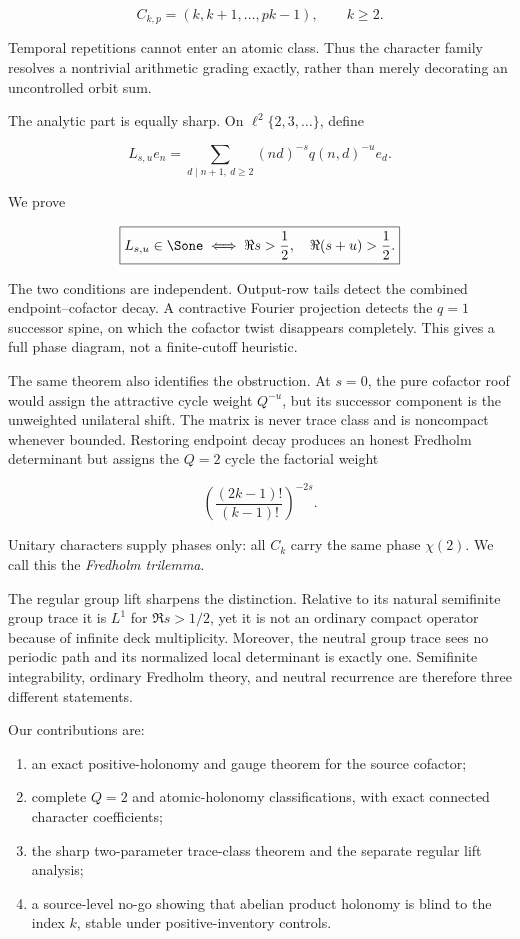\[
 C_{k,p}=(k,k+1,\ldots,pk-1),\qquad k\ge2.
\]

Temporal repetitions cannot enter an atomic class.  Thus the character
family resolves a nontrivial arithmetic grading exactly, rather than merely
decorating an uncontrolled orbit sum.

The analytic part is equally sharp.  On \(\ell^2\{2,3,\ldots\}\), define

\[
 L_{s,u}e_n=
 \sum_{d\mid n+1,\ d\ge2}
 (nd)^{-s}q(n,d)^{-u}e_d.
\]

We prove

\[
 \boxed{
 L_{s,u}\in\Sone
 \iff
 \Re s>\frac12,
 \quad \Re(s+u)>\frac12.}
\]

The two conditions are independent.  Output-row tails detect the combined
endpoint--cofactor decay.  A contractive Fourier projection detects the
\(q=1\) successor spine, on which the cofactor twist disappears completely.
This gives a full phase diagram, not a finite-cutoff heuristic.

The same theorem also identifies the obstruction.  At \(s=0\), the pure
cofactor roof would assign the attractive cycle weight \(Q^{-u}\), but its
successor component is the unweighted unilateral shift.  The matrix is never
trace class and is noncompact whenever bounded.  Restoring endpoint decay
produces an honest Fredholm determinant but assigns the \(Q=2\) cycle the
factorial weight

\[
 \left(\frac{(2k-1)!}{(k-1)!}\right)^{-2s}.
\]

Unitary characters supply phases only: all \(C_k\) carry the same phase
\(\chi(2)\).  We call this the \emph{Fredholm trilemma}.

The regular group lift sharpens the distinction.  Relative to its natural
semifinite group trace it is \(L^1\) for \(\Re s>1/2\), yet it is not an
ordinary compact operator because of infinite deck multiplicity.  Moreover,
the neutral group trace sees no periodic path and its normalized local
determinant is exactly one.  Semifinite integrability, ordinary Fredholm
theory, and neutral recurrence are therefore three different statements.

Our contributions are:

\begin{enumerate}
\item an exact positive-holonomy and gauge theorem for the source cofactor;
\item complete \(Q=2\) and atomic-holonomy classifications, with exact
connected character coefficients;
\item the sharp two-parameter trace-class theorem and the separate regular
lift analysis;
\item a source-level no-go showing that abelian product holonomy is blind to
the index \(k\), stable under positive-inventory controls.
\end{enumerate}

